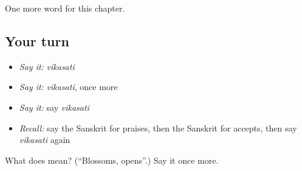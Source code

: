 \begin{grammarlens}[title={What you've built}]
One more word for this chapter.
\end{grammarlens}

\subsection*{Your turn}
\begin{itemize}
\raggedright
  \item \emph{Say it:} \emph{vikasati}
  \item \emph{Say it:} \emph{vikasati}, once more
  \item \emph{Say it:} say \emph{vikasati}
  \item \emph{Recall:} say the Sanskrit for praises, then the Sanskrit for accepts, then say \emph{vikasati} again
\end{itemize}

\begin{tcolorbox}[breakable,colback=teal!4,colframe=teal!35!black,title={Before you move on}]
What does  mean? (\textquotedblleft{}Blossoms, opens\textquotedblright{}.) Say it once more.
\end{tcolorbox}
